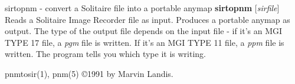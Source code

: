 \newpage
%

sirtopnm - convert a Solitaire file into a portable anymap
{\bf sirtopnm}
{\rm [}{\it sirfile}{\rm ]}
Reads a Solitaire Image Recorder file as input.
Produces a portable anymap as output.
The type of the output file depends on the input file - if it's
an MGI TYPE 17 file, a
{\it pgm}
file is written. If it's an MGI TYPE 11 file, a
{\it ppm}
file is written.  The program tells you which type it is writing.

pnmtosir(1), pnm(5)
\copyright 1991 by Marvin Landis.

%
 
%

\newpage
%

